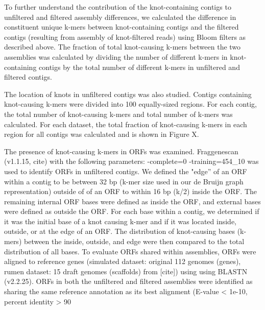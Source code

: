 \documentclass[11pt]{article} %
\begin{document}
To further understand the contribution of the knot-containing
contigs to unfiltered and filtered assembly differences, we calculated
the difference in constituent unique k-mers between knot-containing
contigs and the filtered contigs (resulting from assembly of knot-filtered reads)
using Bloom filters as described above. The fraction of total knot-causing
k-mers between the two assemblies was calculated by dividing the number
of different k-mers in knot-containing contigs by the total number
of different k-mers in unfiltered and filtered contigs. 

The location of knots in unfiltered contigs was also studied. Contigs containing
knot-causing k-mers were divided into 100 equally-sized regions. For
each contig, the total number of knot-causing k-mers and total number
of k-mers was calculated. For each dataset, the total fraction of
knot-causing k-mers in each region for all contigs was calculated
and is shown in Figure X.

The presence of knot-causing k-mers in ORFs was examined. Fraggenescan
(v1.1.15, cite) with the following parameters: -complete=0 -training=454\_10
was used to identify ORFs in unfiltered contigs. We defined the "edge''
of an ORF within a contig to be between 32 bp (k-mer size used in
our de Bruijn graph representation) outside of of an ORF to within
16 bp (k/2) inside the ORF. The remaining internal ORF bases were
defined as inside the ORF, and external bases were defined as outside
the ORF. For each base within a contig, we determined if it was the
initial base of a knot causing k-mer and if it was located inside, outside,
or at the edge of an ORF. The distribution of knot-causing bases (k-mers)
between the inside, outside, and edge were then compared to the total
distribution of all bases.  To evaluate ORFs shared within assemblies, ORFs were aligned to reference genes (simulated dataset:  original 112 genomes (genes), rumen dataset: 15 draft genomes (scaffolds) from [cite]) using using BLASTN (v2.2.25).  ORFs in both the unfiltered and filtered assemblies were identified as sharing the same reference annotation as its best alignment (E-value < 1e-10, percent identity > 90%
	
	





\end{document}
